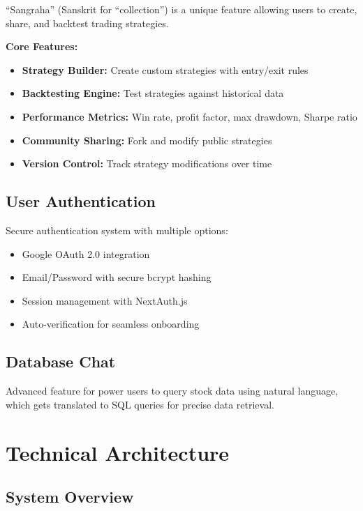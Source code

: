 \documentclass[11pt,a4paper]{article}
\begin{document}
``Sangraha'' (Sanskrit for ``collection'') is a unique feature allowing users to create, share, and backtest trading strategies.

\textbf{Core Features:}
\begin{itemize}[leftmargin=*]
    \item \textbf{Strategy Builder:} Create custom strategies with entry/exit rules
    \item \textbf{Backtesting Engine:} Test strategies against historical data
    \item \textbf{Performance Metrics:} Win rate, profit factor, max drawdown, Sharpe ratio
    \item \textbf{Community Sharing:} Fork and modify public strategies
    \item \textbf{Version Control:} Track strategy modifications over time
\end{itemize}

\subsection{User Authentication}

Secure authentication system with multiple options:
\begin{itemize}[leftmargin=*]
    \item Google OAuth 2.0 integration
    \item Email/Password with secure bcrypt hashing
    \item Session management with NextAuth.js
    \item Auto-verification for seamless onboarding
\end{itemize}

\subsection{Database Chat}

Advanced feature for power users to query stock data using natural language, which gets translated to SQL queries for precise data retrieval.

\section{Technical Architecture}

\subsection{System Overview}
\end{document}
